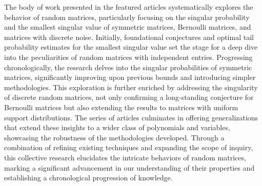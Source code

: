 The body of work presented in the featured articles systematically explores the behavior of random matrices, particularly focusing on the singular probability and the smallest singular value of symmetric matrices, Bernoulli matrices, and matrices with discrete noise. Initially, foundational conjectures and optimal tail probability estimates for the smallest singular value set the stage for a deep dive into the peculiarities of random matrices with independent entries. 
Progressing chronologically, the research delves into the singular probabilities of symmetric matrices, significantly improving upon previous bounds and introducing simpler methodologies. 
This exploration is further enriched by addressing the singularity of discrete random matrices, not only confirming a long-standing conjecture for Bernoulli matrices but also extending the results to matrices with uniform support distributions. 
The series of articles culminates in offering generalizations that extend these insights to a wider class of polynomials and variables, showcasing the robustness of the methodologies developed. Through a combination of refining existing techniques and expanding the scope of inquiry, this collective research elucidates the intricate behaviors of random matrices, marking a significant advancement in our understanding of their properties and establishing a chronological progression of knowledge.
